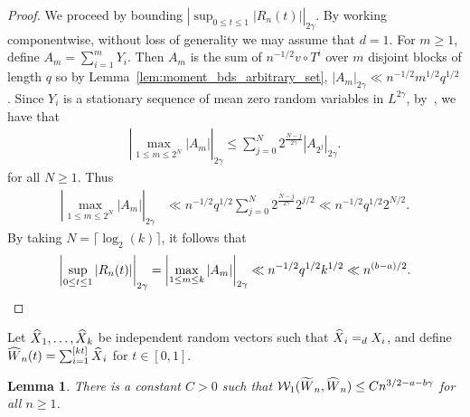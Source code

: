 \documentclass[11pt,a4paper,reqno,oneside]{amsart}
\newcommand{\pnorm}[1]{\left|#1\right|}
\newcommand{\eqd}{=_d}
\newcommand{\wass}{\mathcal{W}}
\newcommand{\kant}{\wass_1}
\newcommand{\shat}[1]{\vphantom{#1}\smash[t]{\widehat{#1}}}
\newcommand{\stilde}[1]{\vphantom{#1}\smash[t]{\widetilde{#1}}}
\newtheorem{lemma}[theorem]{Lemma}
\theoremstyle{definition}
\theoremstyle{remark}
\numberwithin{equation}{section}
\begin{document}
\begin{proof}
	We proceed by bounding $\pnorm{\sup_{0\le t\le 1}|R_n(t)|}_{2\gamma}$. By working componentwise, without loss of generality we may assume that $ d = 1 $. For $m\ge 1$, define $A_m = \sum_{i=1}^m Y_i$. Then $A_m$ is the sum of $n^{-1/2} v\circ T^i$ over $m$ disjoint blocks of length $q$ so by Lemma~\ref{lem:moment_bds_arbitrary_set}, $\pnorm{A_m}_{2\gamma}\ll n^{-1/2}m^{1/2}q^{1/2}$. Since $Y_i$ is a stationary sequence of mean zero random variables in $L^{2\gamma}$, by~\cite[Proposition 1(ii)]{wu_strong_invariance}, we have that
	\begin{align*}
		\pnorm{\max_{1\le m \le 2^N}|A_m|}_{2\gamma}\le \sum_{j=0}^N 2^{\frac{N-j}{2\gamma}}\pnorm{A_{2^j}}_{2\gamma}.
	\end{align*}
	for all $N\ge 1$. Thus 
	\begin{align*}
		\pnorm{\max_{1\le m \le 2^N}|A_m|}_{2\gamma}
		&\ll n^{-1/2}q^{1/2}\sum_{j=0}^N 2^{\frac{N-j}{2\gamma}}2^{j/2}
		\ll n^{-1/2}q^{1/2}2^{N/2}.
	\end{align*}
	By taking $N = \lceil \log_2(k)\rceil$, it follows that 
	\[ \pnorm{\sup_{0\le t\le 1}|R_n(t)|}_{2\gamma}=\pnorm{\max_{1\le m \le k}|A_m|}_{2\gamma}\ll n^{-1/2}q^{1/2}k^{1/2}\ll n^{(b-a)/2}.\qedhere \]
\end{proof}
	Let $ \shat X_1,\dots,\shat X_k $ be independent random vectors such that $ \shat{X}_i \eqd X_i $, and define $ \shat W_n(t)=\sum_{i=1}^{[kt]}\shat X_i $ for $ t\in [0,1] $.
	\begin{lemma}\label{lemma:big_block_indep_approx}
		There is a constant $C>0$ such that $\kant(\stilde W_n, \shat W_n)\le Cn^{3/2-a-b\gamma}$ for all $n\ge 1$.
	\end{lemma}
\end{document}
